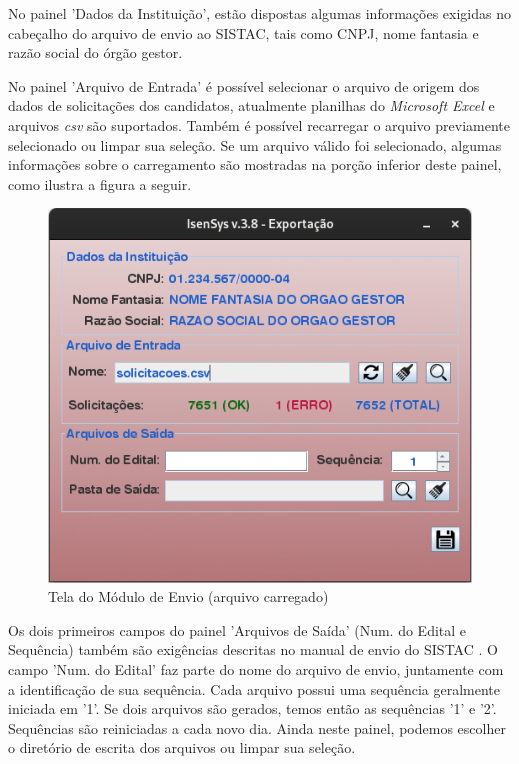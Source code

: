 \documentclass[
	12pt,			%
	openright,		%
	oneside,	
	a4paper,		%
	english,		%
	brazil			%
]{abntex2/abntex2}  %
\begin{document}
				No painel 'Dados da Instituição', estão dispostas algumas informações exigidas no cabeçalho do arquivo de envio ao SISTAC, tais como CNPJ, nome fantasia e razão social do órgão gestor.
	
				No painel 'Arquivo de Entrada' é possível selecionar o arquivo de origem dos dados de solicitações dos candidatos, atualmente planilhas do \textit{Microsoft Excel} e arquivos \textit{csv} são suportados. Também é possível recarregar o arquivo previamente selecionado ou limpar sua seleção. Se um arquivo válido foi selecionado, algumas informações sobre o carregamento são mostradas na porção inferior deste painel, como ilustra a figura a seguir.
	
				\begin{figure}[ht]
					\begin{center}
						
						\caption{Tela do Módulo de Envio (arquivo carregado)}
						\includegraphics[scale=0.5]{img/envio-ui-loaded}
						
					\end{center}
				\end{figure}
	
				Os dois primeiros campos do painel 'Arquivos de Saída' (Num. do Edital e Sequência) também são exigências descritas no manual de envio do SISTAC \cite{sistac-formatos}. O campo 'Num. do Edital' faz parte do nome do arquivo de envio, juntamente com a identificação de sua sequência. Cada arquivo possui uma sequência geralmente iniciada em '1'. Se dois arquivos são gerados, temos então as sequências '1' e '2'. Sequências são reiniciadas a cada novo dia. Ainda neste painel, podemos escolher o diretório de escrita dos arquivos ou limpar sua seleção.
\end{document}
